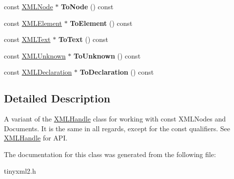\begin{DoxyCompactItemize}
\item 
\hypertarget{classtinyxml2_1_1_x_m_l_const_handle_a95d0256318c10c3f75fa5f8ffb3e4bc1}{}const \hyperlink{classtinyxml2_1_1_x_m_l_node}{X\+M\+L\+Node} $\ast$ {\bfseries To\+Node} () const \label{classtinyxml2_1_1_x_m_l_const_handle_a95d0256318c10c3f75fa5f8ffb3e4bc1}

\item 
\hypertarget{classtinyxml2_1_1_x_m_l_const_handle_a5a48adefc2a5e70d4ce5b55692a0e2f9}{}const \hyperlink{classtinyxml2_1_1_x_m_l_element}{X\+M\+L\+Element} $\ast$ {\bfseries To\+Element} () const \label{classtinyxml2_1_1_x_m_l_const_handle_a5a48adefc2a5e70d4ce5b55692a0e2f9}

\item 
\hypertarget{classtinyxml2_1_1_x_m_l_const_handle_ad86ca7dbb20d0495ae357fe7a866e0be}{}const \hyperlink{classtinyxml2_1_1_x_m_l_text}{X\+M\+L\+Text} $\ast$ {\bfseries To\+Text} () const \label{classtinyxml2_1_1_x_m_l_const_handle_ad86ca7dbb20d0495ae357fe7a866e0be}

\item 
\hypertarget{classtinyxml2_1_1_x_m_l_const_handle_acb358a329e54fa204ed2d0b181566828}{}const \hyperlink{classtinyxml2_1_1_x_m_l_unknown}{X\+M\+L\+Unknown} $\ast$ {\bfseries To\+Unknown} () const \label{classtinyxml2_1_1_x_m_l_const_handle_acb358a329e54fa204ed2d0b181566828}

\item 
\hypertarget{classtinyxml2_1_1_x_m_l_const_handle_a5de0c175845bc30a6f9b3d88d8877eaf}{}const \hyperlink{classtinyxml2_1_1_x_m_l_declaration}{X\+M\+L\+Declaration} $\ast$ {\bfseries To\+Declaration} () const \label{classtinyxml2_1_1_x_m_l_const_handle_a5de0c175845bc30a6f9b3d88d8877eaf}

\end{DoxyCompactItemize}


\subsection{Detailed Description}
A variant of the \hyperlink{classtinyxml2_1_1_x_m_l_handle}{X\+M\+L\+Handle} class for working with const X\+M\+L\+Nodes and Documents. It is the same in all regards, except for the \textquotesingle{}const\textquotesingle{} qualifiers. See \hyperlink{classtinyxml2_1_1_x_m_l_handle}{X\+M\+L\+Handle} for A\+P\+I. 

The documentation for this class was generated from the following file\+:\begin{DoxyCompactItemize}
\item 
tinyxml2.\+h\end{DoxyCompactItemize}
